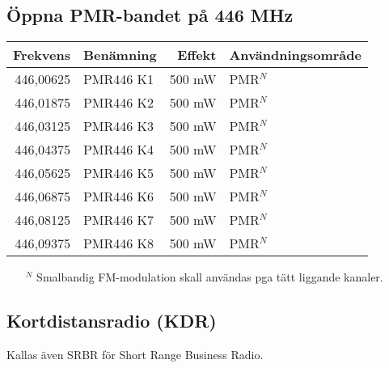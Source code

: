 \subsection{Öppna PMR-bandet på 446 MHz}
\begin{longtable}{rlrl}
	\textbf{Frekvens} & \textbf{Benämning} & \textbf{Effekt} & \textbf{Användningsområde} \\ \hline \endhead
	        446,00625 & PMR446 K1          &          500 mW & PMR$^N$                    \\
	        446,01875 & PMR446 K2          &          500 mW & PMR$^N$                    \\
	        446,03125 & PMR446 K3          &          500 mW & PMR$^N$                    \\
	        446,04375 & PMR446 K4          &          500 mW & PMR$^N$                    \\
	        446,05625 & PMR446 K5          &          500 mW & PMR$^N$                    \\
	        446,06875 & PMR446 K6          &          500 mW & PMR$^N$                    \\
	        446,08125 & PMR446 K7          &          500 mW & PMR$^N$                    \\
	        446,09375 & PMR446 K8          &          500 mW & PMR$^N$
\end{longtable}

\footnotesize
\begin{itemize}
	\item[$^N$] Smalbandig FM-modulation skall användas pga tätt liggande kanaler.
\end{itemize}
\normalsize

\subsection{Kortdistansradio (KDR)}

Kallas även SRBR för Short Range Business Radio.


